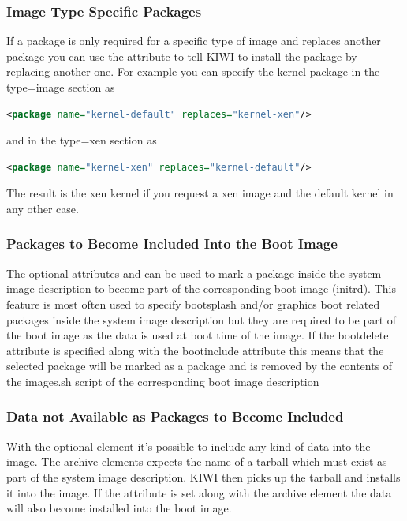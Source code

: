 \subsubsection{Image Type Specific Packages}
If a package is only required for a specific type of image
and replaces another package you can use the  attribute
to tell KIWI to install the package by replacing another one. For example
you can specify the kernel package in the type=image section as

\begin{lstlisting}[language=xml]
<package name="kernel-default" replaces="kernel-xen"/>
\end{lstlisting}

and in the type=xen section as

\begin{lstlisting}[language=xml]
<package name="kernel-xen" replaces="kernel-default"/>
\end{lstlisting}

The result is the xen kernel if you request a xen
image and the default kernel in any other case.

\subsubsection{Packages to Become Included Into the Boot Image}
The optional attributes  and 
can be used to mark a package inside the system image description to
become part of the corresponding boot image (initrd). This feature
is most often used to specify bootsplash and/or graphics boot related
packages inside the system image description but they are required
to be part of the boot image as the data is used at boot time
of the image. If the bootdelete attribute is specified along with
the bootinclude attribute this means that the selected package
will be marked as a  package and is
removed by the contents of the images.sh script of the corresponding
boot image description

\subsubsection{Data not Available as Packages to Become Included}
With the optional  element it's possible to include
any kind of data into the image. The archive elements expects the
name of a tarball which must exist as part of the system image
description. KIWI then picks up the tarball and installs it into
the image. If the  attribute is set along with
the archive element the data will also become installed into the
boot image.



